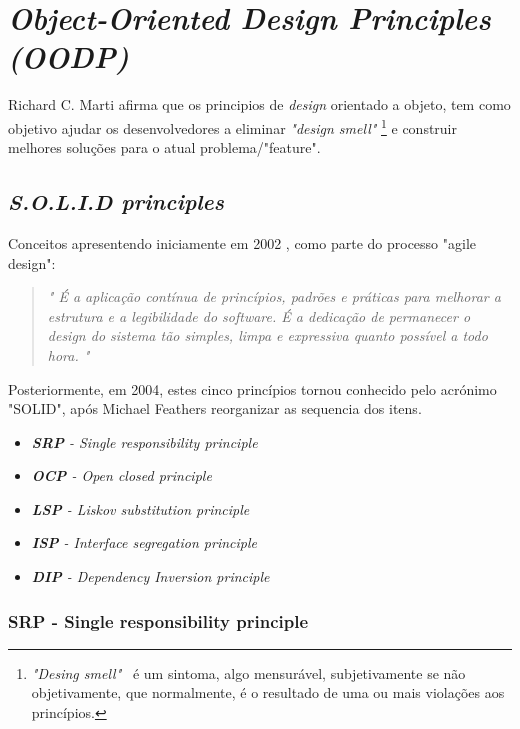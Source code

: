 \documentclass[12pt]{article}
\begin{document}
\section{\textit{Object-Oriented Design Principles (OODP)}} \label{sec:oopd}
 
 Richard C. Marti \cite{ROBERT_MARTIN_AGILE_SW_DEV_PPP} afirma que os principios de \textit{design} orientado a objeto, tem como objetivo ajudar os desenvolvedores a eliminar \textit{"design smell"} \footnote{\textit{"Desing smell"}\ \cite{ROBERT_MARTIN_AGILE_SW_DEV_PPP} é um sintoma, algo mensurável, subjetivamente se não objetivamente, que normalmente, é o resultado de uma ou mais violações aos princípios.} e construir melhores soluções para o atual problema/"feature".

\subsection{\textit{S.O.L.I.D principles}} \label{sec:solid}

 Conceitos apresentendo iniciamente em 2002 \cite{ROBERT_MARTIN_AGILE_SW_DEV_PPP}, como parte do processo "agile design":
 
 \begin{quote}
\textit{" É a aplicação contínua de princípios, padrões e práticas para melhorar a estrutura e a legibilidade do software. É a dedicação de permanecer o design do sistema tão simples, limpa e expressiva quanto possível a todo hora. "}
 \end{quote}

 Posteriormente, em 2004, estes cinco princípios tornou conhecido pelo acrónimo "SOLID", após Michael Feathers reorganizar as sequencia dos itens. 

\begin{itemize}
	\item \textit{\textbf{SRP} - Single responsibility principle}
	\item \textit{\textbf{OCP} - Open closed principle}
	\item \textit{\textbf{LSP} - Liskov substitution principle}
	\item \textit{\textbf{ISP} - Interface segregation principle}
	\item \textit{\textbf{DIP} - Dependency Inversion principle}
\end{itemize}

\subsubsection{SRP - Single responsibility principle}
\end{document}

